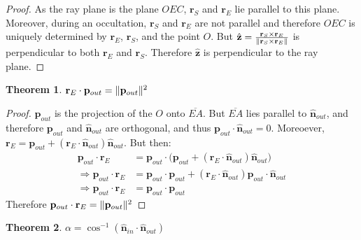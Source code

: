\documentclass[oneside]{book}
\theoremstyle{mystyle}
\newtheorem{theorem}{Theorem}[section]
\DeclarePairedDelimiter\norm{\lVert}{\rVert}
\begin{document}
\begin{proof}
As the ray plane is the plane $OEC$, $\mathbf{r}_{S}$ and $\mathbf{r}_{E}$ lie parallel to this plane. Moreover, during an occultation, $\mathbf{r}_{S}$ and $\mathbf{r}_{E}$ are not parallel and therefore $OEC$ is uniquely determined by $\mathbf{r}_{E}$, $\mathbf{r}_{S}$, and the point $O$. But $\hat{\mathbf{z}} = \frac{\mathbf{r}_{S}\times \mathbf{r}_{E}}{\norm{\mathbf{r}_{S}\times \mathbf{r}_{E}}}$ is perpendicular to both $\mathbf{r}_{E}$ and $\mathbf{r}_{S}$. Therefore $\hat{\mathbf{z}}$ is perpendicular to the ray plane.
\end{proof}
\begin{theorem}
\label{theorem:r_e_dot_p_out_equal_p_out_square}
$\mathbf{r}_{E}\cdot \mathbf{p}_{out} = \norm{\mathbf{p}_{out}}^2$
\end{theorem}
\begin{proof}
$\mathbf{p}_{out}$ is the projection of the $O$ onto $\overline{EA}$. But $\overline{EA}$ lies parallel to $\hat{\mathbf{n}}_{out}$, and therefore $\mathbf{p}_{out}$ and $\hat{\mathbf{n}}_{out}$ are orthogonal, and thus $\mathbf{p}_{out}\cdot\hat{\mathbf{n}}_{out}=0$. Moreoever, $\mathbf{r}_{E} = \mathbf{p}_{out}+(\mathbf{r}_{E}\cdot \hat{\mathbf{n}}_{out}) \hat{\mathbf{n}}_{out}$. But then:
\begin{align*}
    \mathbf{p}_{out}\cdot \mathbf{r}_{E} &= \mathbf{p}_{out}\cdot\big(\mathbf{p}_{out}+(\mathbf{r}_{E}\cdot \hat{\mathbf{n}}_{out})\hat{\mathbf{n}}_{out}\big)\\
    \Rightarrow \mathbf{p}_{out}\cdot \mathbf{r}_{E} &= \mathbf{p}_{out}\cdot \mathbf{p}_{out} + (\mathbf{r}_{E}\cdot \hat{\mathbf{n}}_{out}) \mathbf{p}_{out}\cdot \hat{\mathbf{n}}_{out}\\
    \Rightarrow \mathbf{p}_{out}\cdot \mathbf{r}_{E} &= \mathbf{p}_{out}\cdot \mathbf{p}_{out}
\end{align*}
Therefore $\mathbf{p}_{out}\cdot \mathbf{r}_{E} = \norm{\mathbf{p}_{out}}^2$
\end{proof}
\begin{theorem}
$\alpha = \cos^{-1}(\hat{\mathbf{n}}_{in}\cdot \hat{\mathbf{n}}_{out})$
\end{theorem}
\end{document}
